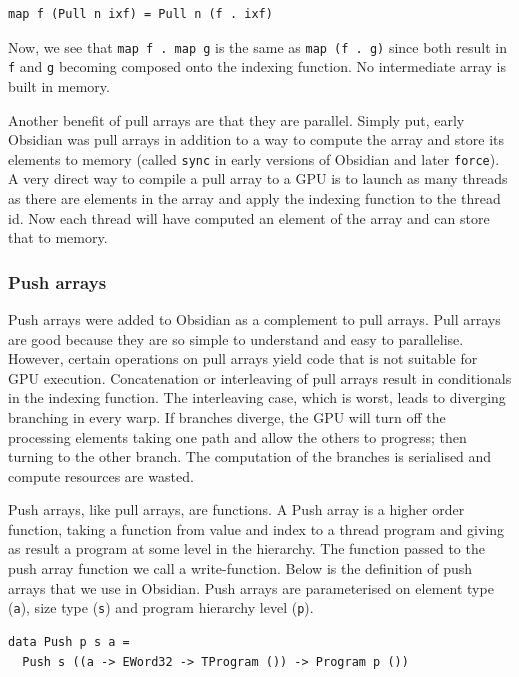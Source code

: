 \documentclass[a4paper]{book}
\begin{document}
\begin{verbatim} 
map f (Pull n ixf) = Pull n (f . ixf)
\end{verbatim}

Now, we see that \verb!map f . map g! is the same as \verb!map (f . g)! since both result in {\tt f}
and {\tt g} becoming composed onto the indexing function. No intermediate array is built in 
memory.  

Another benefit of pull arrays are that they are parallel. Simply put, early Obsidian was pull 
arrays in addition to a way to compute the array and store its elements to memory 
(called {\tt sync} in early versions of Obsidian and later {\tt force}). A very 
direct way to compile a pull array to a GPU is to launch as many threads as there are 
elements in the array and apply the indexing function to the thread id. Now each thread 
will have computed an element of the array and can store that to memory. 

 
\subsubsection{Push arrays}

Push arrays were added to Obsidian as a complement to pull arrays. Pull arrays are 
good because they are so simple to understand and easy to parallelise. However, certain
operations on pull arrays yield code that is not suitable for GPU execution. Concatenation 
or interleaving of pull arrays result in conditionals in the indexing function. The 
interleaving case, which is worst, leads to diverging branching in every warp. If branches 
diverge, the GPU will turn off the processing elements taking one path and 
allow the others to progress; then turning to the other branch. The computation of the 
branches is serialised and compute resources are wasted. 

Push arrays, like pull arrays, are functions. A Push array is a higher order 
function, taking a function from value and index to a thread program and giving 
as result a program at some level in the hierarchy. The function passed to the 
push array function we call a write-function. Below is the definition of 
push arrays that we use in Obsidian. Push arrays are parameterised on element 
type ({\tt a}), size type ({\tt s}) and program hierarchy level ({\tt p}). 

\begin{verbatim}
data Push p s a =
  Push s ((a -> EWord32 -> TProgram ()) -> Program p ())
\end{verbatim} 
\end{document}
